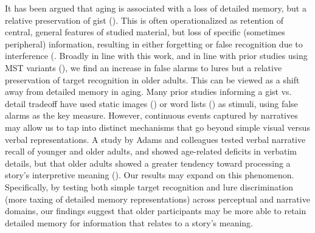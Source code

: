 \documentclass[11pt]{article}
\begin{document}
It has been argued that aging is associated with a loss of detailed memory, but a relative preservation of gist (\cite{schacter_false_1997}). This is often operationalized as retention of central, general features of studied material, but loss of specific (sometimes peripheral) information, resulting in either forgetting or false recognition due to interference (\cite{koutstaal_gist-based_1997, norman_false_1997, tun_response_nodate}. Broadly in line with this work, and in line with prior studies using MST variants (\cite{stark_task_2013, stark_stability_2015, stark_mnemonic_2019}), we find an increase in false alarms to lures but a relative preservation of target recognition in older adults. This can be viewed as a shift away from detailed memory in aging. Many prior studies informing a gist vs. detail tradeoff have used static images (\cite{stark_stability_2015}) or word lists (\cite{norman_false_1997}) as stimuli, using false alarms as the key measure. However, continuous events captured by narratives may allow us to tap into distinct mechanisms that go beyond simple visual versus verbal representations. A study by Adams and colleagues tested verbal narrative recall of younger and older adults, and showed age-related deficits in verbatim details, but that older adults showed a greater tendency toward processing a story’s interpretive meaning (\cite{adams_adult_1997}). Our results may expand on this phenomenon. Specifically, by testing both simple target recognition and lure discrimination (more taxing of detailed memory representations) across perceptual and narrative domains, our findings suggest that older participants may be more able to retain detailed memory for information that relates to a story’s meaning.
\end{document}
